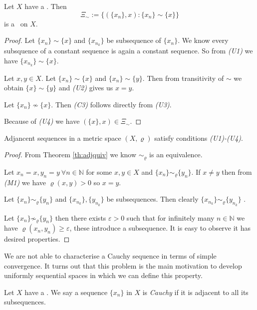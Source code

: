 \begin{theorem} \label{th:unitoseq}
	Let $X$ have a \uss. Then
\[
	\Xi_\sim:=\bigg\{(\{x_n\},x): \{x_n\}\sim \{x\}\bigg\}
\]
is a \fcs\ on $X$.
\end{theorem}
\begin{proof}
Let $\{x_n\}\sim \{x\}$ and $\{x_{n_k}\}$ be subsequence of $\{x_n\}$. We know every subsquence of a constant sequence is again a constant sequence. So from \emph{(U1)} we have $\{x_{n_k}\}\sim \{x\}$.

Let $x,y\in X$. Let $\{x_n\} \sim \{x\}$ and $\{x_n\} \sim \{y\}$. Then from transitivity of $\sim$ we obtain $\{x\} \sim \{y\}$ and \emph{(U2)} gives us $x=y$.

Let $\{x_n\} \not\sim \{x\}$. Then \emph{(C3)} follows directly from \emph{(U3)}.

Because of \emph{(U4)} we have $(\{x\},x)\in\Xi_\sim$.
\end{proof}

\begin{theorem}\label{th:adjprop}
Adjancent sequences in a metric space $(X,\varrho)$ satisfy conditions \emph{(U1)-(U4)}.
\end{theorem}
\begin{proof}
From Theorem \ref{th:adjquiv} we know  $\sim_\varrho$ is an equivalence.

Let $x_n=x, y_n=y\ \forall n\in \mathbb{N}$ for some $x,y\in X$ and $\{x_n\} \sim_\varrho \{y_n\}$. If $x\ne y$ then from \emph{(M1)} we have $\varrho(x,y)>0$ so $x=y$.

Let $\{x_n\} \sim_\varrho \{y_n\}$ and $\{x_{n_k}\}, \{y_{n_k}\}$ be subsequences. Then clearly $\{x_{n_k}\}\sim_\varrho \{y_{n_k}\}$ .

Let $\{x_n\} \not\sim_\varrho \{y_n\}$ then there exists $\varepsilon>0$ such that for infinitely many $n \in \mathbb{N}$ we have $\varrho(x_n,y_n)\ge\varepsilon$, these introduce a subsequence. It is easy to observe it has desired properties.
\end{proof}

We are not able to characterise a Cauchy sequence in terms of simple convergence. It turns out that this problem is the main motivation to develop uniformly sequential spaces in which we can define this property.

\begin{define}\label{def:ucauch}
Let $X$ have a \uss. We say a sequence $\{x_n\}$ in $X$ is \emph{Cauchy} if it is adjacent to all its subsequences.
\end{define}

